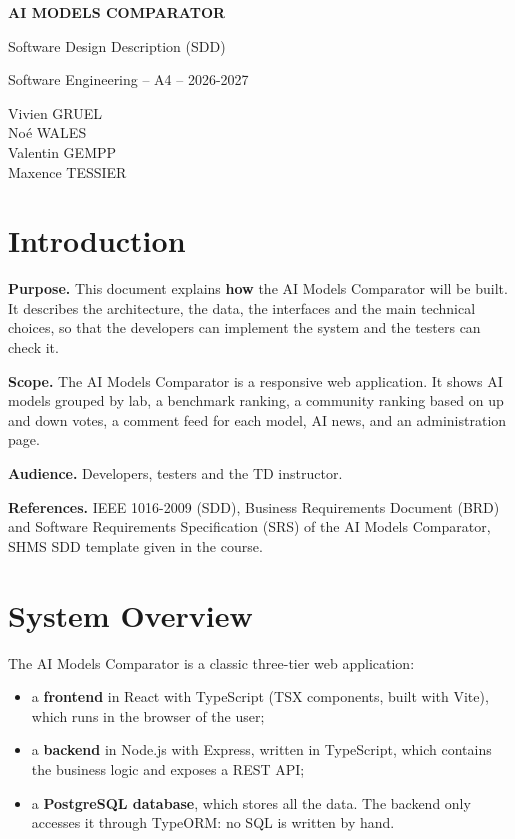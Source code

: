 \documentclass[11pt,a4paper]{article}
\newcommand{\product}{AI Models Comparator}
\newcommand{\team}{Vivien GRUEL \\ Noé WALES \\ Valentin GEMPP \\ Maxence TESSIER}
\begin{document}
\begin{titlepage}
  \centering
  \vspace*{4cm}
  {\Huge\bfseries \MakeUppercase{\product}\par}
  \vspace{1.5cm}
  {\LARGE Software Design Description (SDD)\par}
  \vspace{4cm}
  {\large Software Engineering -- A4 -- 2026-2027\par}
  \vspace{1cm}
  {\large \team\par}
  \vfill
\end{titlepage}

\tableofcontents
\newpage

\section{Introduction}

\textbf{Purpose.} This document explains \textbf{how} the \product{} will be built. It describes the architecture, the data, the interfaces and the main technical choices, so that the developers can implement the system and the testers can check it.

\textbf{Scope.} The \product{} is a responsive web application. It shows AI models grouped by lab, a benchmark ranking, a community ranking based on up and down votes, a comment feed for each model, AI news, and an administration page.

\textbf{Audience.} Developers, testers and the TD instructor.

\textbf{References.} IEEE 1016-2009 (SDD), Business Requirements Document (BRD) and Software Requirements Specification (SRS) of the \product{}, SHMS SDD template given in the course.

\section{System Overview}

The \product{} is a classic three-tier web application:
\begin{itemize}
  \item a \textbf{frontend} in React with TypeScript (TSX components, built with Vite), which runs in the browser of the user;
  \item a \textbf{backend} in Node.js with Express, written in TypeScript, which contains the business logic and exposes a REST API;
  \item a \textbf{PostgreSQL database}, which stores all the data. The backend only accesses it through TypeORM: no SQL is written by hand.
\end{itemize}
\end{document}
